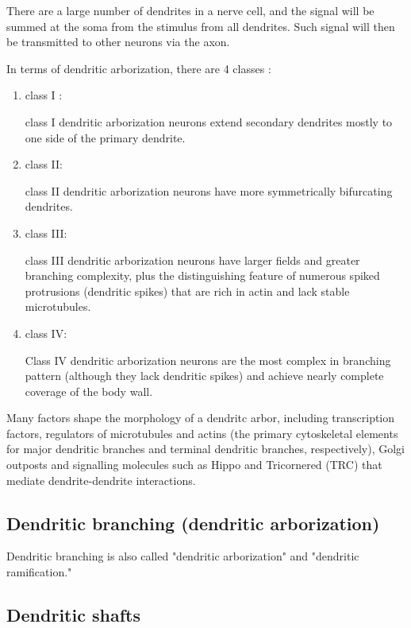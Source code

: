 There are a large number of dendrites in a nerve cell, and the signal will be
summed at the soma from the stimulus from all dendrites. Such signal will then
be transmitted to other neurons via the axon.

In terms of dendritic arborization, there are 4 classes \citep{yuh-nung2010}:
\begin{enumerate}
  \item class I : 
  
  class I dendritic arborization neurons extend secondary dendrites mostly to
  one side of the primary dendrite.
  
  \item class II:
  
  class II dendritic arborization neurons have more symmetrically bifurcating
  dendrites.
  
  \item class III:
  
  class III dendritic arborization neurons have larger fields and greater
  branching complexity, plus the distinguishing feature of numerous spiked
  protrusions (dendritic spikes) that are rich in actin and lack stable
  microtubules.
  
  \item class IV:
  
   Class IV dendritic arborization neurons are the most complex in branching
   pattern (although they lack dendritic spikes) and achieve nearly complete
   coverage of the body wall.
   
\end{enumerate}

Many factors shape the morphology of a dendritc arbor, including
transcription factors, regulators of microtubules and actins (the primary
cytoskeletal elements for major dendritic branches and terminal dendritic
branches, respectively), Golgi outposts and signalling molecules such as Hippo
and Tricornered (TRC) that mediate dendrite-dendrite interactions.

\subsection{Dendritic branching (dendritic arborization)}
\label{sec:dendritic-branching}

Dendritic branching is also called "dendritic arborization" and "dendritic
ramification."


\subsection{Dendritic shafts}
\label{sec:dendritic-shaft}

